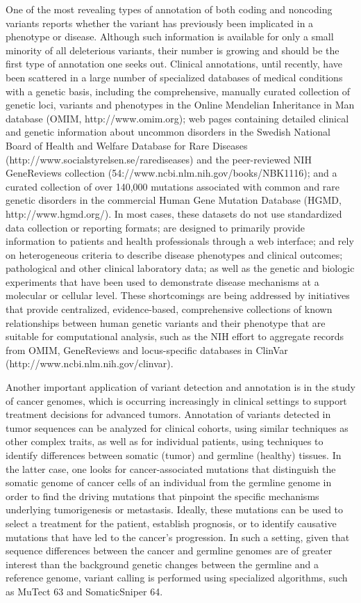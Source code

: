 One of the most revealing types of annotation of both coding and noncoding variants reports whether the variant has previously been implicated in a phenotype or disease. Although such information is available for only a small minority of all deleterious variants, their number is growing and should be the first type of annotation one seeks out. Clinical annotations, until recently, have been scattered in a large number of specialized databases of medical conditions with a genetic basis, including the comprehensive, manually curated collection of genetic loci, variants and phenotypes in the Online Mendelian Inheritance in Man database (OMIM, http://www.omim.org); web pages containing detailed clinical and genetic information about uncommon disorders in the Swedish National Board of Health and Welfare Database for Rare Diseases (http://www.socialstyrelsen.se/rarediseases) and the peer-reviewed NIH GeneReviews collection (54://www.ncbi.nlm.nih.gov/books/NBK1116); and a curated collection of over 140,000 mutations associated with common and rare genetic disorders in the commercial Human Gene Mutation Database (HGMD, http://www.hgmd.org/). In most cases, these datasets do not use standardized data collection or reporting formats; are designed to primarily provide information to patients and health professionals through a web interface; and rely on heterogeneous criteria to describe disease phenotypes and clinical outcomes; pathological and other clinical laboratory data; as well as the genetic and biologic experiments that have been used to demonstrate disease mechanisms at a molecular or cellular level. These shortcomings are being addressed by initiatives that provide centralized, evidence-based, comprehensive collections of known relationships between human genetic variants and their phenotype that are suitable for computational analysis, such as the NIH effort to aggregate records from OMIM, GeneReviews and locus-specific databases in ClinVar (http://www.ncbi.nlm.nih.gov/clinvar). 

Another important application of variant detection and annotation is in the study of cancer genomes, which is occurring increasingly in clinical settings to support treatment decisions for advanced tumors. Annotation of variants detected in tumor sequences can be analyzed for clinical cohorts, using similar techniques as other complex traits, as well as for individual patients, using techniques to identify differences between somatic (tumor) and germline (healthy) tissues. In the latter case, one looks for cancer-associated mutations that distinguish the somatic genome of cancer cells of an individual from the germline genome in order to find the driving mutations that pinpoint the specific mechanisms underlying tumorigenesis or metastasis. Ideally, these mutations can be used to select a treatment for the patient, establish prognosis, or to identify causative mutations that have led to the cancer’s progression. In such a setting, given that sequence differences between the cancer and germline genomes are of greater interest than the background genetic changes between the germline and a reference genome, variant calling is performed using specialized algorithms, such as MuTect 63 and SomaticSniper 64.

